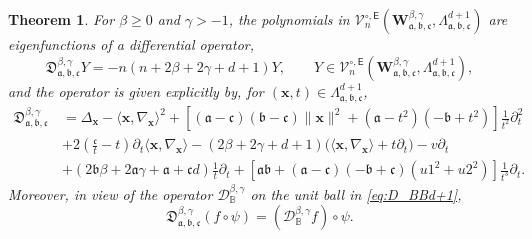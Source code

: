 \documentclass{amsart}
\newtheorem{thm}{Theorem}[section]
\theoremstyle{remark}
\def\la{{\langle}}
\def\ra{{\rangle}}
\def\sE{{\mathsf E}}
\def\fa{{\mathfrak a}}
\def\fb{{\mathfrak b}}
\def\fc{{\mathfrak c}}
\def\fD{{\mathfrak D}}
\def\b{{\beta}}
\def\g{{\gamma}}
\def\la{{\langle}}
\def\ra{{\rangle}}
\def\xb{{\mathbf x}}
\def\Wb{{\mathbf W}}
\def\CD{{\mathcal D}}
\def\CV{{\mathcal V}}
\def\BB{{\mathbb B}}
\begin{document}
\begin{thm} \label{thm:PDE_d}
For $\b \ge 0$ and $\g > -1$, the polynomials in $\CV_n^{\circ, \sE}(\Wb_{\fa,\fb,\fc}^{\b,\g}, \Lambda_{\fa,\fb,\fc}^{d+1})$ 
are eigenfunctions of a differential operator, 
\begin{equation} \label{eq:spectral-d}
    \fD_{\fa,\fb,\fc}^{\b,\g} Y = -n(n+ 2\b+2\g+ d+1) Y, \qquad 
         Y \in \CV_n^{\circ, \sE}\left(\Wb_{\fa,\fb,\fc}^{\b,\g}, \Lambda_{\fa,\fb,\fc}^{d+1}\right),
\end{equation} 
and the operator is given explicitly by, for $(\xb, t) \in \Lambda_{\fa,\fb,\fc}^{d+1}$, 
\begin{align*}
 \fD_{\fa,\fb,\fc}^{\b,\g} \, & = \Delta_\xb - \la \xb,\nabla_\xb\ra^2  + 
    \left [(\fa-\fc) (\fb-\fc)\|\xb\|^2 +(\fa - t^2)(-\fb+ t^2)\right] \frac{1}{t^2} \partial_t^2 \\
  & + 2\left (\frac{\fc}{t}- t\right) \partial_t  \la \xb,\nabla_\xb\ra
         -(2\b+2\g+d+1) \big(\la \xb,\nabla_\xb\ra + t \partial_t \big) -v \partial_t \\
   & +(2 \fb \b + 2 \fa \g + \fa + \fc d) \frac{1}{t} \partial_t
   + \left [\fa \fb + (\fa - \fc) (-\fb + \fc ) ( u1^2 + u2^2)\right] \frac{1}{t^3} \partial_t. 
 \end{align*}
Moreover, in view of the operator $\CD_\BB^{\b,\g}$ on the unit ball in \eqref{eq:D_BBd+1},  
\begin{equation} \label{eq:fD=Dd}
        \fD_{\fa,\fb,\fc}^{\b,\g} (f\circ \psi) = \left(\CD_\BB^{\b,\g} f \right) \circ \psi.   
\end{equation}
\end{thm} 
\end{document}
